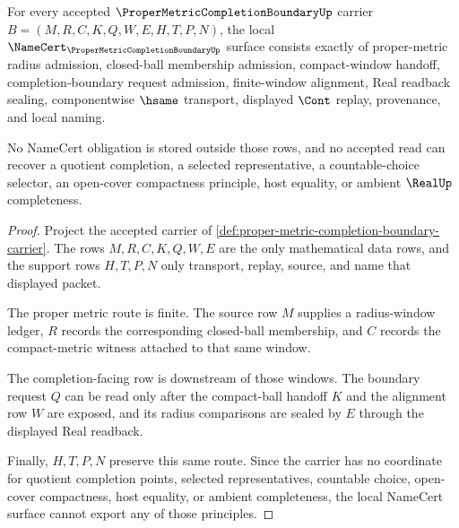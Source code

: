 \begin{theorem}
\label{thm:proper-metric-completion-boundary-namecert-obligations}
For every accepted $\ProperMetricCompletionBoundaryUp$ carrier $B=(M,R,C,K,Q,W,E,H,T,P,N)$, the local $\NameCert_{\ProperMetricCompletionBoundaryUp}$ surface consists exactly of proper-metric radius admission, closed-ball membership admission, compact-window handoff, completion-boundary request admission, finite-window alignment, Real readback sealing, componentwise $\hsame$ transport, displayed $\Cont$ replay, provenance, and local naming.

No NameCert obligation is stored outside those rows, and no accepted read can recover a quotient completion, a selected representative, a countable-choice selector, an open-cover compactness principle, host equality, or ambient $\RealUp$ completeness.
\end{theorem}
\begin{proof}
Project the accepted carrier of \autoref{def:proper-metric-completion-boundary-carrier}. The rows $M,R,C,K,Q,W,E$ are the only mathematical data rows, and the support rows $H,T,P,N$ only transport, replay, source, and name that displayed packet.

The proper metric route is finite. The source row $M$ supplies a radius-window ledger, $R$ records the corresponding closed-ball membership, and $C$ records the compact-metric witness attached to that same window.

The completion-facing row is downstream of those windows. The boundary request $Q$ can be read only after the compact-ball handoff $K$ and the alignment row $W$ are exposed, and its radius comparisons are sealed by $E$ through the displayed Real readback.

Finally, $H,T,P,N$ preserve this same route. Since the carrier has no coordinate for quotient completion points, selected representatives, countable choice, open-cover compactness, host equality, or ambient completeness, the local NameCert surface cannot export any of those principles.
\end{proof}

